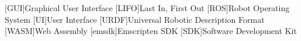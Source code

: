 \chapter*{}



\section*{}
\begin{acronym}[LONGEST]

    [GUI]{Graphical User Interface}
    [LIFO]{Last In, First Out}
    [ROS]{Robot Operating System}
    [UI]{User Interface}
    [URDF]{Universal Robotic Description Format}
    [WASM]{Web Assembly}
    [emsdk]{Emscripten SDK}
    [SDK]{Software Development Kit}

\end{acronym}







